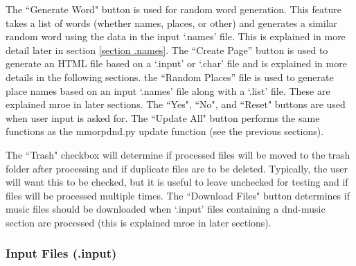 The ``Generate Word" button is used for random word generation. This feature takes a list of words (whether names, places, or other) and generates a similar random word using the data in the input `.names' file. This is explained in more detail later in section \ref{section .names}. The ``Create Page'' button is used to generate an HTML file based on a `.input' or `.char' file and is explained in more details in the following sections. the ``Random Places'' file is used to generate place names based on an input `.names' file along with a `.list' file. These are explained mroe in later sections. The ``Yes", ``No", and ``Reset" buttons are used when user input is asked for. The ``Update All" button performs the same functions as the mmorpdnd.py update function (see the previous sections).

The ``Trash" checkbox will determine if processed files will be moved to the trash folder after processing and if duplicate files are to be deleted. Typically, the user will want this to be checked, but it is useful to leave unchecked for testing and if files will be processed multiple times. The ``Download Files" button determines if music files should be downloaded when `.input' files containing a dnd-music section are processed (this is explained mroe in later sections).

\subsubsection{Input Files (.input) \label{input files section}}

